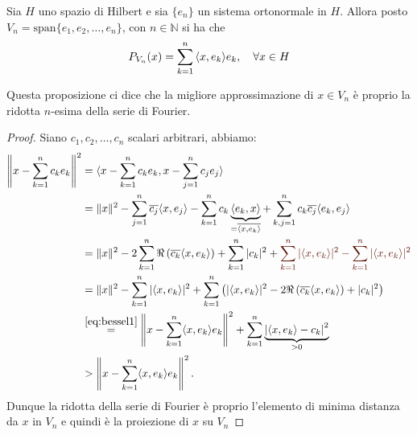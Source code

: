 \begin{proposition}\label{prop:2-45}
    Sia \(H\) uno spazio di Hilbert e sia \(\{e_{n}\} \) un sistema ortonormale
    in \(H\). Allora posto \(V_{n} = \mathrm{span}\{e_{1}, e_{2}, \dots, e_{n}\}\), con
    \(n \in \mathbb{N}\) si ha che 
    \[
      P_{V_{n}} {(x)} = \sum_{k=1}^{n} {\left\langle x, e_{k}\right\rangle} e_{k}, \quad \forall x
      \in H 
    \]
\end{proposition}
\begin{remark}
    Questa proposizione ci dice che la migliore approssimazione di \(x \in
    V_{n}\) è proprio la ridotta \(n\)-esima della serie di Fourier.
\end{remark}
\begin{proof}
    Siano \(c_{1}, c_{2}, \dots, c_{n}\) scalari arbitrari, abbiamo:
    \[
    \begin{aligned}
        \left\| x - \sum_{k=1}^{n} c_{k} e_{k} \right\|^2 
        &= \langle x - \sum_{k=1}^{n} c_{k} e_{k}, x - \sum_{j=1}^{n} c_{j} e_{j} \rangle \\
        &= \|x\|^2 - \sum_{j=1}^{n} \overline{c_{j}} \langle x, e_{j} \rangle 
           - \sum_{k=1}^{n} c_{k} \underbrace{\langle e_{k}, x \rangle}_{= \overline{\langle x, e_{k} \rangle}} 
           + \sum_{k,j=1}^{n} c_{k} \overline{c_{j}} \langle e_{k}, e_{j} \rangle \\
        &= \|x\|^2 - 2 \sum_{k=1}^{n} \Re \left( \overline{c_{k}} \langle x, e_{k} \rangle \right) 
           + \sum_{k=1}^{n} |c_{k}|^2 + \color{Sepia}  \sum_{k=1}^{n} |\langle x, e_{k} \rangle|^2 
           - \sum_{k=1}^{n} |\langle x, e_{k} \rangle|^2 \\
        &= \|x\|^2 - \sum_{k=1}^{n} |\langle x, e_{k} \rangle|^2 
           + \sum_{k=1}^{n} \left( |\langle x, e_k \rangle|^2 
           - 2 \Re \left( \overline{c_{k}} \langle x, e_{k} \rangle \right) + |c_{k}|^2 \right) \\
        &\overset{\eqref{eq:bessel1}}{=} \left\| x - \sum_{k=1}^{n} \langle x, e_{k} \rangle e_{k} \right\|^2 
           + \sum_{k=1}^{n} \underbrace{\left| \langle x, e_{k} \rangle - c_{k} \right|^2}_{> 0} \\
        &> \left\| x - \sum_{k=1}^{n} \langle x, e_{k} \rangle e_{k} \right\|^2.
    \end{aligned}
    \]
    Dunque la ridotta della serie di Fourier è proprio l'elemento di minima
    distanza da \(x\) in \(V_{n}\) e quindi è la proiezione di \(x\) su
    \(V_{n}\)
\end{proof}

